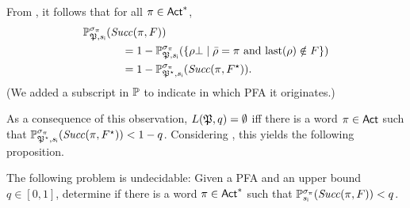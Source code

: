 From , it follows that for all $\pi\in{\rm \sf Act}^*$,
%
\begin{align*}
  \Prob_{\pfa,\sini}^{\strat_\plan}(\Succ(\plan,F)) \hspace{-4em} & \\
  &  =
  1 - \Prob_{\pfa,\sini}^{\strat_\plan}(\{{\rho\complete}\mid{\bar{\rho}=\plan \text{ and } \last(\rho)\notin F}\}) \\
  & =
  1 - \Prob_{\pfa^\star,\sini}^{\strat_\plan}(\Succ(\plan,F^\star)).
\end{align*}
%
(We added a subscript in $\mathbb{P}$ to indicate in which PFA it
originates.)

As a consequence of this observation, $L({\mathfrak{P}},q)=\emptyset$ iff there
is a word $\pi\in{\rm \sf Act}$ such that
$\mathbb{P}_{{\mathfrak{P}}^\star,{s_{\textsf{i}}}}^{\sigma_\pi}(\mathit{Succ}(\pi,F^\star)) < 1-q$.
%
Considering , this yields the
following proposition.

\begin{proposition}
  The following problem is undecidable:
  Given a PFA and an upper bound $q\in[0,1]$, determine if there is a
  word $\pi\in{\rm \sf Act}^*$ such that
  $\mathbb{P}_{{s_{\textsf{i}}}}^{\sigma_\pi}(\mathit{Succ}(\pi,F)) < q$.
\end{proposition}
